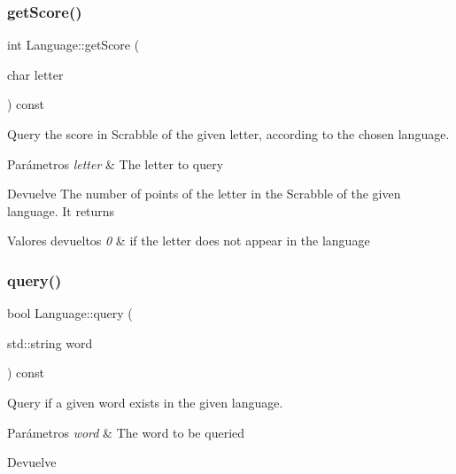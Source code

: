 \subsubsection{\texorpdfstring{get\+Score()}{getScore()}}
{\footnotesize\ttfamily int Language\+::get\+Score (\begin{DoxyParamCaption}\item[{char}]{letter }\end{DoxyParamCaption}) const}



Query the score in Scrabble of the given letter, according to the chosen language. 


\begin{DoxyParams}{Parámetros}
{\em letter} & The letter to query \\
\hline
\end{DoxyParams}
\begin{DoxyReturn}{Devuelve}
The number of points of the letter in the Scrabble of the given language. It returns 
\end{DoxyReturn}

\begin{DoxyRetVals}{Valores devueltos}
{\em 0} & if the letter does not appear in the language \\
\hline
\end{DoxyRetVals}
\mbox{\label{classLanguage_a54e61d6c3ff6ec45c43e8d577fd91d41}} 
\subsubsection{\texorpdfstring{query()}{query()}}
{\footnotesize\ttfamily bool Language\+::query (\begin{DoxyParamCaption}\item[{std\+::string}]{word }\end{DoxyParamCaption}) const}



Query if a given word exists in the given language. 


\begin{DoxyParams}{Parámetros}
{\em word} & The word to be queried \\
\hline
\end{DoxyParams}
\begin{DoxyReturn}{Devuelve}

\end{DoxyReturn}

